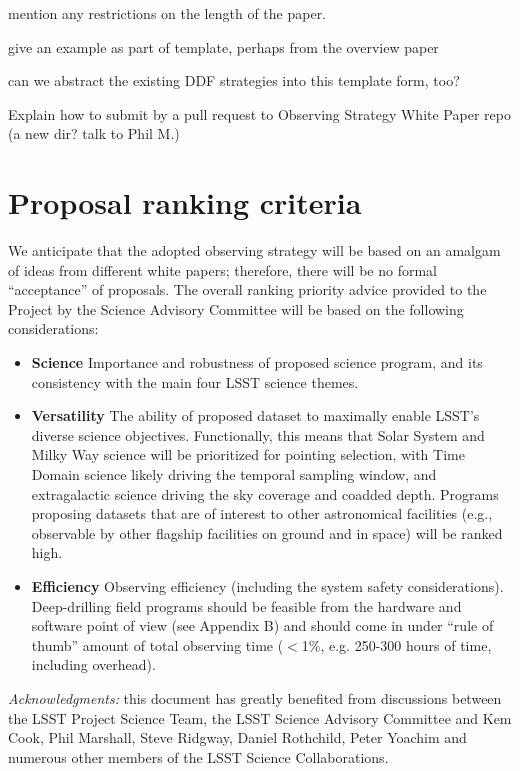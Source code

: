 \documentclass[DM,lsstdraft,toc,usenatbib]{lsstdoc}
\begin{document}
mention any restrictions on the length of the paper. 

give an example as part of template, perhaps from the overview paper

can we abstract the existing DDF strategies into this template form, too? 


Explain how to submit by a pull request to Observing Strategy White Paper repo
(a new dir? talk to Phil M.) 




\section{Proposal ranking criteria} 

We anticipate that the adopted observing strategy will be based on an amalgam of ideas from 
different white papers; therefore, there will be no formal ``acceptance'' of proposals. The
overall ranking priority advice provided to the Project by the Science Advisory Committee 
will be based on the following considerations: 
\begin{itemize}
\item {\bf Science} Importance and robustness of proposed science program, and its 
                               consistency with the main four LSST science themes. 
\item {\bf Versatility} The ability of proposed dataset to maximally enable LSST’s diverse science objectives. 
          Functionally, this means that Solar System and Milky Way science will be prioritized for pointing selection,
          with Time Domain science likely driving the temporal sampling window, and extragalactic science driving 
          the sky coverage and coadded depth. Programs proposing datasets that are of interest to other astronomical 
          facilities (e.g., observable by other flagship facilities on ground and in space) will be ranked high. 
\item {\bf Efficiency} Observing efficiency (including the system safety considerations).  Deep-drilling field 
          programs should be feasible from the hardware and software point of view (see Appendix B) and should 
          come in under ``rule of thumb'' amount of total observing time ($<$1\%, e.g. 250-300 hours of time,
          including overhead). 
\end{itemize} 



\vskip 0.0in
\newpage
{\it Acknowledgments:} this document has greatly benefited from discussions between 
the LSST Project Science Team, the LSST Science Advisory Committee and Kem Cook, 
Phil Marshall, Steve Ridgway, Daniel Rothchild, Peter Yoachim and numerous other members 
of the LSST Science Collaborations. 
\end{document}

